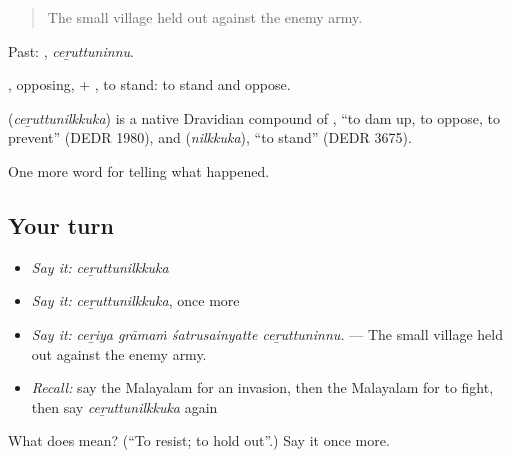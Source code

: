 \begin{quote}
The small village held out against the enemy army.
\end{quote}

Past: , \emph{ceṟuttuninnu}.

, opposing, + , to stand: to stand and oppose.

\begin{cousinweb}
\textbf{} (\emph{ceṟuttunilkkuka}) is a native Dravidian compound of , \textquotedblleft{}to dam up, to oppose, to prevent\textquotedblright{} (DEDR 1980), and  (\emph{nilkkuka}), \textquotedblleft{}to stand\textquotedblright{} (DEDR 3675).
\end{cousinweb}

\begin{grammarlens}[title={What you've built}]
One more word for telling what happened.
\end{grammarlens}

\subsection*{Your turn}
\begin{itemize}
\raggedright
  \item \emph{Say it:} \emph{ceṟuttunilkkuka}
  \item \emph{Say it:} \emph{ceṟuttunilkkuka}, once more
  \item \emph{Say it:} \emph{ceṟiya grāmaṁ śatrusainyatte ceṟuttuninnu.} — The small village held out against the enemy army.
  \item \emph{Recall:} say the Malayalam for an invasion, then the Malayalam for to fight, then say \emph{ceṟuttunilkkuka} again
\end{itemize}

\begin{tcolorbox}[breakable,colback=teal!4,colframe=teal!35!black,title={Before you move on}]
What does  mean? (\textquotedblleft{}To resist; to hold out\textquotedblright{}.) Say it once more.
\end{tcolorbox}
